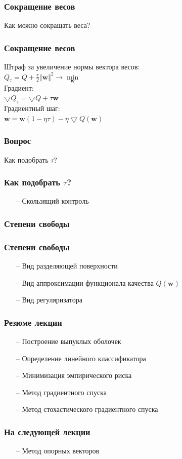\documentclass[12pt]{beamer}
\begin{document}
\begin{frame}\frametitle{Сокращение весов}
Как можно сокращать веса?
\end{frame}

\begin{frame}\frametitle{Сокращение весов}
Штраф за увеличение нормы вектора весов:\\
$Q_{\tau} = Q + \frac{\tau}{2}\Vert \mathbf{w} \Vert^2 \rightarrow \min\limits_{\mathbf{w}}$\\
\vspace{5mm}
Градиент:\\
$\bigtriangledown Q_{\tau} = \bigtriangledown Q + \tau \mathbf{w}$\\
\vspace{5mm}
Градиентный шаг:\\
$\mathbf{w} = \mathbf{w}(1-\eta \tau) - \eta \bigtriangledown Q(\mathbf{w})$
\end{frame}

\begin{frame}\frametitle{Вопрос}
Как подобрать $\tau$?
\end{frame}

\begin{frame}\frametitle{Как подобрать $\tau$?}
\begin{itemize}
\item[--] Скользящий контроль
\end{itemize}
\end{frame}

\begin{frame}\frametitle{Степени свободы}

\end{frame}

\begin{frame}\frametitle{Степени свободы}
\begin{itemize}
\item[--] Вид разделяющей поверхности
\item[--] Вид аппроксимации функционала качества $Q(\mathbf{w})$
\item[--] Вид регуляризатора
\end{itemize}
\end{frame}

\begin{frame}\frametitle{Резюме лекции}
\begin{itemize}
\item[--] Построение выпуклых оболочек
\item[--] Определение линейного классификатора
\item[--] Минимизация эмпирического риска
\item[--] Метод градиентного спуска
\item[--] Метод стохастического градиентного спуска
\end{itemize}
\end{frame}

\begin{frame}\frametitle{На следующей лекции}
\begin{itemize}
\item[--] Метод опорных векторов
\end{itemize}
\end{frame}
\end{document}
